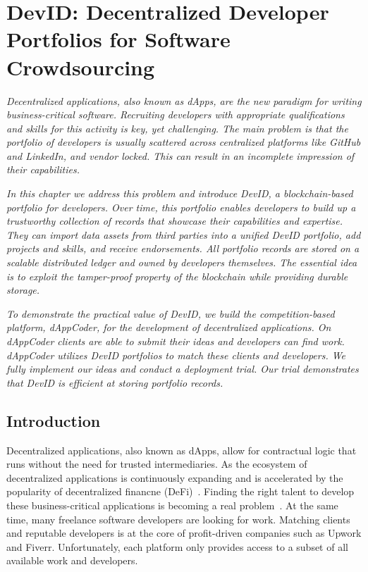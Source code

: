 \chapter{DevID: Decentralized Developer Portfolios for Software Crowdsourcing}
\label{chapter:devid}

\emph{Decentralized applications, also known as dApps, are the new paradigm for writing business-critical software.
Recruiting developers with appropriate qualifications and skills for this activity is key, yet challenging.
The main problem is that the portfolio of developers is usually scattered across centralized platforms like GitHub and LinkedIn, and vendor locked.
This can result in an incomplete impression of their capabilities. }

\emph{In this chapter we address this problem and introduce \emph{DevID}, a blockchain-based portfolio for developers.
Over time, this portfolio enables developers to build up a trustworthy collection of records that showcase their capabilities and expertise.
They can import data assets from third parties into a unified DevID portfolio, add projects and skills, and receive endorsements.
All portfolio records are stored on a scalable distributed ledger and owned by developers themselves.
The essential idea is to exploit the tamper-proof property of the blockchain while providing durable storage.}

\emph{To demonstrate the practical value of DevID, we build the competition-based platform, \emph{dAppCoder}, for the development of decentralized applications.
On dAppCoder clients are able to submit their ideas and developers can find work.
dAppCoder utilizes DevID portfolios to match these clients and developers.
We fully implement our ideas and conduct a deployment trial.
Our trial demonstrates that DevID is efficient at storing portfolio records. }

\newpage

\section{Introduction}
\label{sec:introduction}
Decentralized applications, also known as dApps, allow for contractual logic that runs without the need for trusted intermediaries.
As the ecosystem of decentralized applications is continuously expanding and is accelerated by the popularity of decentralized financne (DeFi)~\cite{zetzsche2020decentralized}.
Finding the right talent to develop these business-critical applications is becoming a real problem~\cite{shortage2016nasdaq}.
At the same time, many freelance software developers are looking for work.
Matching clients and reputable developers is at the core of profit-driven companies such as Upwork and Fiverr.
Unfortunately, each platform only provides access to a subset of all available work and developers.


